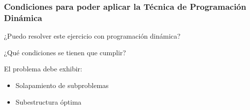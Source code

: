 \documentclass[spanish]{beamer}
\begin{document}
    \begin{frame}
        \frametitle{Condiciones para poder aplicar la Técnica de Programación Dinámica}

        \begin{center}
            ¿Puedo resolver este ejercicio con programación dinámica?

            \pause

            \vspace{1em}
            ¿Qué condiciones se tienen que cumplir?
        \end{center}

        \pause

        \vspace{1em}
        El problema debe exhibir:

        \begin{itemize}
            \item<4-> Solapamiento de subproblemas
            \item<5-> Subestructura óptima
        \end{itemize}
    \end{frame}
\end{document}
